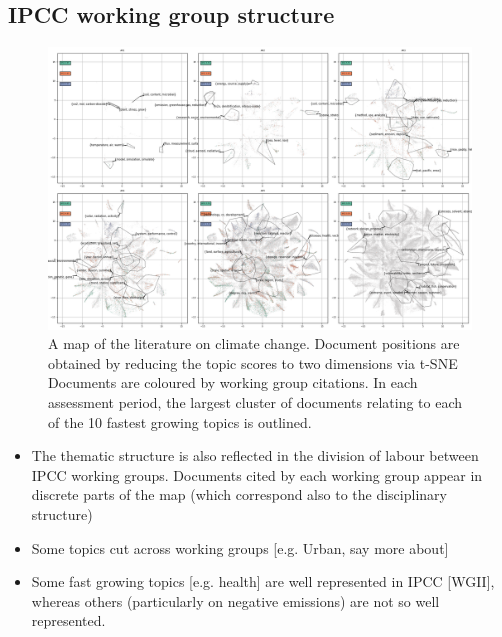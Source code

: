 \documentclass{article}
\begin{document}
\subsection{IPCC working group structure}
\begin{figure}[h!]
	\begin{center}
		\includegraphics[width=1\linewidth]{tsne_results/plots/run_1275_s_0_p100_evolution.png}
		\caption{A map of the literature on climate change. Document positions are obtained by reducing the topic scores to two dimensions via t-SNE Documents are coloured by working group citations. In each assessment period, the largest cluster of documents relating to each of the 10 fastest growing topics is outlined.}
		\label{map-evolution}
		
	\end{center}
\end{figure}

\begin{itemize}
	\item The thematic structure is also reflected in the division of labour between IPCC working groups. Documents cited by each working group appear in discrete parts of the map (which correspond also to the disciplinary structure)
	\item Some topics cut across working groups [e.g. Urban, say more about]
	\item Some fast growing topics [e.g. health] are well represented in IPCC [WGII], whereas others (particularly on negative emissions) are not so well represented.
	
\end{itemize}
\end{document}
